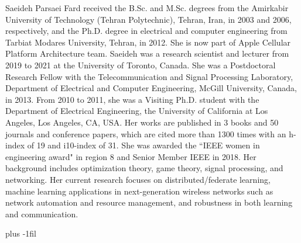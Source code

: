 \begin{IEEEbiography}{Saeideh Parsaei Fard}%
 received the B.Sc. and M.Sc. degrees from the Amirkabir University of Technology (Tehran Polytechnic), Tehran, Iran, in 2003 and 2006, respectively, and the Ph.D. degree in electrical and computer engineering from Tarbiat Modares University, Tehran, in 2012. She is now part of Apple Cellular Platform Architecture team. Saeideh was a research scientist and lecturer from 2019 to 2021 at the University of Toronto, Canada. She was a Postdoctoral Research Fellow with the Telecommunication and Signal Processing Laboratory, Department of Electrical and Computer Engineering, McGill University, Canada, in 2013. From 2010 to 2011, she was a Visiting Ph.D. student with the Department of Electrical Engineering, the University of California at Los Angeles, Los Angeles, CA, USA. Her works are published in 3 books and 50 journals and conference papers, which are cited more than 1300 times with an h-index of 19 and i10-index of 31. She was awarded the “IEEE women in engineering award" in region 8 and Senior Member IEEE in 2018. Her background includes optimization theory, game theory, signal processing, and networking. Her current research focuses on distributed/federate learning, machine learning applications in next-generation wireless networks such as network automation and resource management, and robustness in both learning and communication. 
 \vspace{-1mm}
\end{IEEEbiography}
 \vskip 0pt plus -1fil

